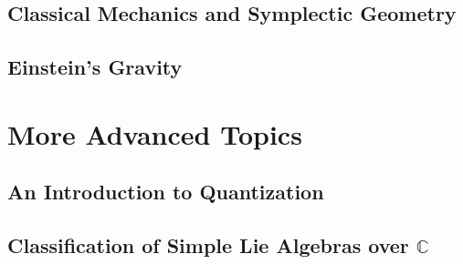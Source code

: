 \documentclass[12pt, twoside, openany]{book}
\newcommand{\1}{\mathbbm{1}}
\begin{document}
\chapter{Classical Mechanics and Symplectic Geometry}

\chapter{Einstein's Gravity}

\part{More Advanced Topics}

\chapter{An Introduction to Quantization}

\chapter{Classification of Simple Lie Algebras over $\mathbb{C}$}



\printindex
\end{document}
